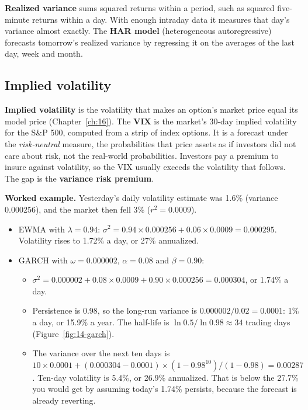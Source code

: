 \textbf{Realized variance} sums squared returns within a period, such as squared five-minute returns within a day. With enough intraday data it measures that day's variance almost exactly. The \textbf{HAR model} (heterogeneous autoregressive) forecasts tomorrow's realized variance by regressing it on the averages of the last day, week and month.

\subsection{Implied volatility}
\label{sec:14-iv}

\textbf{Implied volatility} is the volatility that makes an option's market price equal its model price (Chapter~\ref{ch:16}). The \textbf{VIX} is the market's 30-day implied volatility for the S\&P 500, computed from a strip of index options. It is a forecast under the \emph{risk-neutral} measure, the probabilities that price assets as if investors did not care about risk, not the real-world probabilities. Investors pay a premium to insure against volatility, so the VIX usually exceeds the volatility that follows. The gap is the \textbf{variance risk premium}.

\textbf{Worked example.} Yesterday's daily volatility estimate was 1.6\% (variance 0.000256), and the market then fell 3\% ($r^2 = 0.0009$).

\begin{itemize}
  \item EWMA with $\lambda = 0.94$: $\sigma^2 = 0.94 \times 0.000256 + 0.06 \times 0.0009 = 0.000295$. Volatility rises to 1.72\% a day, or 27\% annualized.
  \item GARCH with $\omega = 0.000002$, $\alpha = 0.08$ and $\beta = 0.90$:
  \begin{itemize}
    \item $\sigma^2 = 0.000002 + 0.08 \times 0.0009 + 0.90 \times 0.000256 = 0.000304$, or 1.74\% a day.
    \item Persistence is 0.98, so the long-run variance is $0.000002 / 0.02 = 0.0001$: 1\% a day, or 15.9\% a year. The half-life is $\ln 0.5 / \ln 0.98 \approx 34$ trading days (Figure~\ref{fig:14-garch}).
    \item The variance over the next ten days is $10 \times 0.0001 + (0.000304 - 0.0001) \times (1 - 0.98^{10})/(1 - 0.98) = 0.00287$. Ten-day volatility is 5.4\%, or 26.9\% annualized. That is below the 27.7\% you would get by assuming today's 1.74\% persists, because the forecast is already reverting.
  \end{itemize}
\end{itemize}

